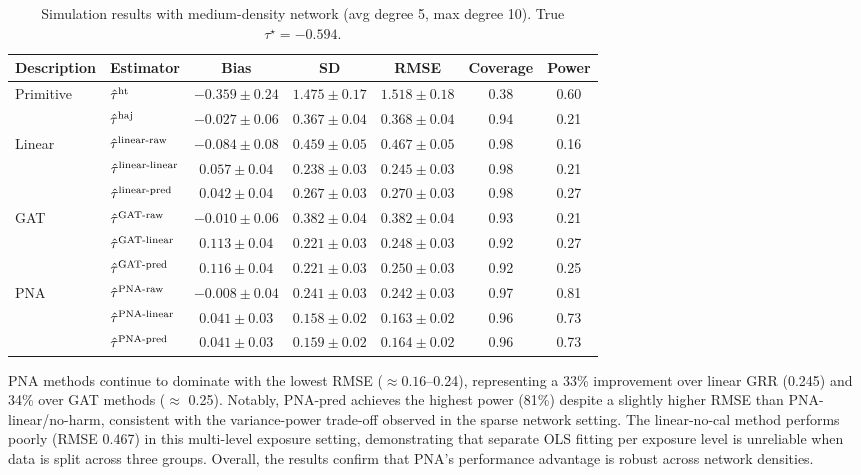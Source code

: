 \documentclass[twoside]{article}
\theoremstyle{plain}
\theoremstyle{definition}
\theoremstyle{remark}
\newcommand{\hort}{\textup{ht}}
\newcommand{\haj}{\textup{haj}}
\begin{document}
\begin{table}[h]
    \centering
    \caption{Simulation results with medium-density network (avg degree 5, max degree 10). True $\tau^\star = -0.594$.}
    \small
    \begin{tabular}{ll|ccc|cc}
        \toprule
        Description & Estimator & Bias & SD & RMSE & Coverage & Power \\
        \midrule
        Primitive  & $\hat\tau^{\hort}$ & $-0.359 \pm 0.24$ & $1.475 \pm 0.17$ & $1.518 \pm 0.18$ & 0.38 & 0.60 \\
        & $\hat\tau^{\haj}$ & $-0.027 \pm 0.06$ & $0.367 \pm 0.04$ & $0.368 \pm 0.04$ & 0.94 & 0.21 \\
        \midrule
        Linear
        & $\hat\tau^{\textup{linear-raw}}$ & $-0.084 \pm 0.08$ & $0.459 \pm 0.05$ & $0.467 \pm 0.05$ & 0.98 & 0.16 \\
        & $\hat\tau^{\textup{linear-linear}}$ & $0.057 \pm 0.04$ & $0.238 \pm 0.03$ & $0.245 \pm 0.03$ & 0.98 & 0.21 \\
        & $\hat\tau^{\textup{linear-pred}}$ & $0.042 \pm 0.04$ & $0.267 \pm 0.03$ & $0.270 \pm 0.03$ & 0.98 & 0.27 \\
        \midrule
        GAT
        & $\hat\tau^{\textup{GAT-raw}}$ & $-0.010 \pm 0.06$ & $0.382 \pm 0.04$ & $0.382 \pm 0.04$ & 0.93 & 0.21 \\
        & $\hat\tau^{\textup{GAT-linear}}$ & $0.113 \pm 0.04$ & $0.221 \pm 0.03$ & $0.248 \pm 0.03$ & 0.92 & 0.27 \\
        & $\hat\tau^{\textup{GAT-pred}}$ & $0.116 \pm 0.04$ & $0.221 \pm 0.03$ & $0.250 \pm 0.03$ & 0.92 & 0.25 \\
        \midrule
        PNA
        & $\hat\tau^{\textup{PNA-raw}}$ & $\mathbf{-0.008 \pm 0.04}$ & $\mathbf{0.241 \pm 0.03}$ & $\mathbf{0.242 \pm 0.03}$ & 0.97 & 0.81 \\
        & $\hat\tau^{\textup{PNA-linear}}$ & $\mathbf{0.041 \pm 0.03}$ & $\mathbf{0.158 \pm 0.02}$ & $\mathbf{0.163 \pm 0.02}$ & 0.96 & 0.73 \\
        & $\hat\tau^{\textup{PNA-pred}}$ & $\mathbf{0.041 \pm 0.03}$ & $\mathbf{0.159 \pm 0.02}$ & $\mathbf{0.164 \pm 0.02}$ & 0.96 & 0.73 \\
        \bottomrule
    \end{tabular}
    \label{tab::simu_out2_results}
\end{table}

PNA methods continue to dominate with the lowest RMSE ($\approx 0.16$--0.24), representing a 33\% improvement over linear GRR (0.245) and 34\% over GAT methods ($\approx$ 0.25). Notably, PNA-pred achieves the highest power (81\%) despite a slightly higher RMSE than PNA-linear/no-harm, consistent with the variance-power trade-off observed in the sparse network setting. The linear-no-cal method performs poorly (RMSE 0.467) in this multi-level exposure setting, demonstrating that separate OLS fitting per exposure level is unreliable when data is split across three groups. Overall, the results confirm that PNA's performance advantage is robust across network densities.
\end{document}
